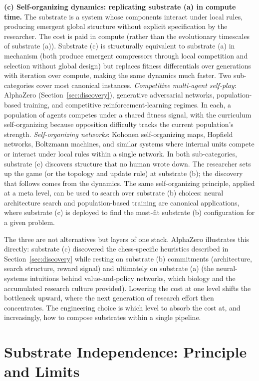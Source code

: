 \documentclass[11pt]{article}
\begin{document}
\textbf{(c) Self-organizing dynamics: replicating substrate (a) in compute time.} The substrate is a system whose components interact under local rules, producing emergent global structure without explicit specification by the researcher. The cost is paid in compute (rather than the evolutionary timescales of substrate (a)). Substrate (c) is structurally equivalent to substrate (a) in mechanism (both produce emergent compressors through local competition and selection without global design) but replaces fitness differentials over generations with iteration over compute, making the same dynamics much faster. Two sub-categories cover most canonical instances. \emph{Competitive multi-agent self-play}: AlphaZero (Section~\ref{sec:discovery}), generative adversarial networks, population-based training, and competitive reinforcement-learning regimes. In each, a population of agents competes under a shared fitness signal, with the curriculum self-organizing because opposition difficulty tracks the current population's strength. \emph{Self-organizing networks}: Kohonen self-organizing maps, Hopfield networks, Boltzmann machines, and similar systems where internal units compete or interact under local rules within a single network. In both sub-categories, substrate (c) discovers structure that no human wrote down. The researcher sets up the game (or the topology and update rule) at substrate (b); the discovery that follows comes from the dynamics. The same self-organizing principle, applied at a meta level, can be used to search over substrate (b) choices: neural architecture search and population-based training are canonical applications, where substrate (c) is deployed to find the most-fit substrate (b) configuration for a given problem.

The three are not alternatives but layers of one stack. AlphaZero illustrates this directly: substrate (c) discovered the chess-specific heuristics described in Section~\ref{sec:discovery} while resting on substrate (b) commitments (architecture, search structure, reward signal) and ultimately on substrate (a) (the neural-systems intuitions behind value-and-policy networks, which biology and the accumulated research culture provided). Lowering the cost at one level shifts the bottleneck upward, where the next generation of research effort then concentrates. The engineering choice is which level to absorb the cost at, and increasingly, how to compose substrates within a single pipeline.

\section{Substrate Independence: Principle and Limits}\label{sec:substrate_independence}
\end{document}
